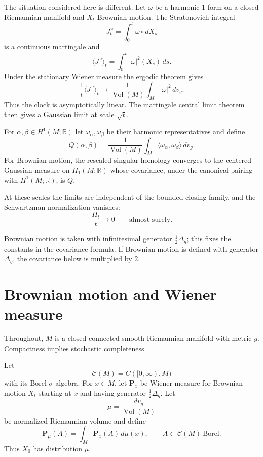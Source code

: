 \documentclass[a4paper,reqno]{amsart}
\newcommand{\R}{\mathbb R}
\newcommand{\Ccal}{\mathcal C}
\newcommand{\Pp}{\mathbf P}
\newcommand{\Vol}{\operatorname{Vol}}
\theoremstyle{definition}
\begin{document}
The situation considered here is different.  Let $\omega$ be a harmonic $1$-form on a closed Riemannian manifold and $X_t$ Brownian motion.  The Stratonovich integral
\[
   J_t^\omega=\int_0^t \omega\circ dX_s
\]
is a continuous martingale and
\[
   \langle J^\omega\rangle_t
   =\int_0^t |\omega|^2(X_s)\,ds.
\]
Under the stationary Wiener measure the ergodic theorem gives
\[
   \frac{1}{t}\langle J^\omega\rangle_t
   \longrightarrow
   \frac{1}{\Vol(M)}\int_M |\omega|^2\,dv_g.
\]
Thus the clock is asymptotically linear.  The martingale central limit theorem then gives a Gaussian limit at scale $\sqrt t$.

For $\alpha,\beta\in H^1(M;\R)$ let $\omega_\alpha,\omega_\beta$ be their harmonic representatives and define
\begin{equation}\label{eq:Qintro}
   Q(\alpha,\beta)
   =\frac{1}{\Vol(M)}
   \int_M\langle\omega_\alpha,\omega_\beta\rangle\,dv_g.
\end{equation}
For Brownian motion, the rescaled singular homology converges to the centered Gaussian measure on $H_1(M;\R)$ whose covariance, under the canonical pairing with $H^1(M;\R)$, is $Q$.

At these scales the limits are independent of the bounded closing family, and the Schwartzman normalization vanishes:
\[
   \frac{H_t}{t}\longrightarrow0
   \qquad\text{almost surely}.
\]

Brownian motion is taken with infinitesimal generator $\frac12\Delta_g$; this fixes the constants in the covariance formula.  If Brownian motion is defined with generator $\Delta_g$, the covariance below is multiplied by $2$.

\section{Brownian motion and Wiener measure}

Throughout, $M$ is a closed connected smooth Riemannian manifold with metric $g$.  Compactness implies stochastic completeness.

Let
\[
   \Ccal(M)=C([0,\infty),M)
\]
with its Borel $\sigma$-algebra.  For $x\in M$, let $\Pp_x$ be Wiener measure for Brownian motion $X_t$ starting at $x$ and having generator $\frac12\Delta_g$.  Let
\[
   \mu=\frac{dv_g}{\Vol(M)}
\]
be normalized Riemannian volume and define
\begin{equation}\label{eq:stationaryWiener}
   \Pp_\mu(A)=\int_M \Pp_x(A)\,d\mu(x),
   \qquad A\subset\Ccal(M)\ \text{Borel}.
\end{equation}
Thus $X_0$ has distribution $\mu$.
\end{document}
